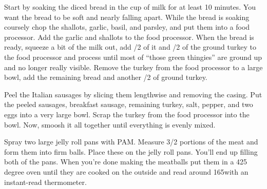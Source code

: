 

\begin{IngredientsAndSteps}
    {
        Start by soaking the diced bread in the cup of milk for at least 10 minutes. You want the bread to be
        soft and nearly falling apart. While the bread is soaking coursely chop the shallots, garlic, basil,
        and parsley, and put them into a food processor.  Add the garlic and shallots to the food processor.
        When the bread is ready, squeeze a bit of the milk out, add /2 of it and /2 \Pd
        of the ground turkey to the food processor and process until most of ``those green thingies'' are
        ground up and no longer really visible. Remove the turkey from the food processor to a large bowl, add the
        remaining bread and another /2 \Pd of ground turkey.

        Peel the Italian sausages by slicing them lengthwise and removing the casing. Put the peeled sausages,
        breakfast sausage, remaining turkey, salt, pepper, and two eggs into a very large bowl. Scrap the turkey
        from the food processor into the bowl. Now, smoosh it all together until everything is evenly mixed.

        Spray two large jelly roll pans with PAM. Measure 3/2 \Ounce portions of the meat and form them
        into firm balls. Place these on the jelly roll pans. You'll end up filling both of the pans. When you're done
        making the meatballs put them in a 425 degree oven until they are cooked on the outside and read around
        165\Degrees[F] with an instant-read thermometer.
    }


\end{IngredientsAndSteps}
